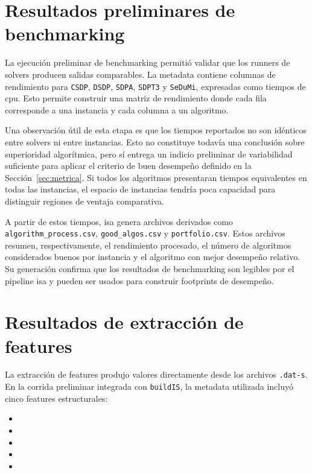 \section{Resultados preliminares de benchmarking}
\label{sec:resultados_benchmark}

La ejecución preliminar de benchmarking permitió validar que los runners de solvers
producen salidas comparables.
La metadata contiene columnas de rendimiento para \texttt{CSDP}, \texttt{DSDP},
\texttt{SDPA}, \texttt{SDPT3} y \texttt{SeDuMi}, expresadas como tiempos de
\acrshort{cpu}.
Esto permite construir una matriz de rendimiento donde cada fila corresponde a una
instancia y cada columna a un algoritmo.

Una observación útil de esta etapa es que los tiempos reportados no son idénticos
entre solvers ni entre instancias.
Esto no constituye todavía una conclusión sobre superioridad algorítmica, pero sí
entrega un indicio preliminar de variabilidad suficiente para aplicar el criterio de
buen desempeño definido en la Sección~\ref{sec:metrica}.
Si todos los algoritmos presentaran tiempos equivalentes en todas las instancias, el
espacio de instancias tendría poca capacidad para distinguir regiones de ventaja
comparativa.

A partir de estos tiempos, \acrshort{isa} genera archivos derivados como
\texttt{algorithm\_process.csv}, \texttt{good\_algos.csv} y \texttt{portfolio.csv}.
Estos archivos resumen, respectivamente, el rendimiento procesado, el número de
algoritmos considerados buenos por instancia y el algoritmo con mejor desempeño
relativo.
Su generación confirma que los resultados de benchmarking son legibles por el pipeline
\acrshort{isa} y pueden ser usados para construir footprints de desempeño.

\section{Resultados de extracción de features}
\label{sec:resultados_features}

La extracción de features produjo valores directamente desde los
archivos \texttt{.dat-s}.
En la corrida preliminar integrada con \texttt{buildIS}, la metadata utilizada incluyó
cinco features estructurales:
\begin{itemize}
    \item {}
    \item {}
    \item {}
    \item {}
    \item {}
\end{itemize}


